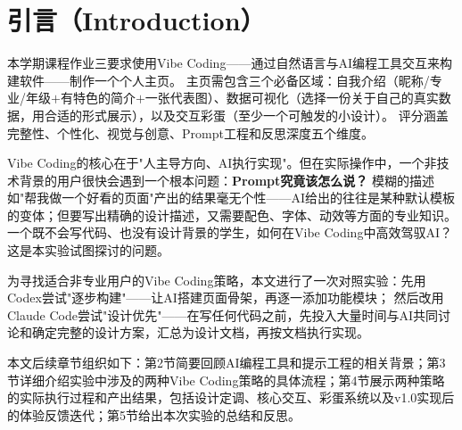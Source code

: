 \section{引言（Introduction）}

本学期课程作业三要求使用Vibe Coding——通过自然语言与AI编程工具交互来构建软件——制作一个个人主页。
主页需包含三个必备区域：自我介绍（昵称/专业/年级$+$有特色的简介$+$一张代表图）、数据可视化（选择一份关于自己的真实数据，用合适的形式展示），以及交互彩蛋（至少一个可触发的小设计）。
评分涵盖完整性、个性化、视觉与创意、Prompt工程和反思深度五个维度。

Vibe Coding的核心在于"人主导方向、AI执行实现"。但在实际操作中，一个非技术背景的用户很快会遇到一个根本问题：\textbf{Prompt究竟该怎么说？}
模糊的描述如"帮我做一个好看的页面"产出的结果毫无个性——AI给出的往往是某种默认模板的变体；但要写出精确的设计描述，又需要配色、字体、动效等方面的专业知识。
一个既不会写代码、也没有设计背景的学生，如何在Vibe Coding中高效驾驭AI？这是本实验试图探讨的问题。

为寻找适合非专业用户的Vibe Coding策略，本文进行了一次对照实验：先用Codex尝试"逐步构建"——让AI搭建页面骨架，再逐一添加功能模块；
然后改用Claude Code尝试"设计优先"——在写任何代码之前，先投入大量时间与AI共同讨论和确定完整的设计方案，汇总为设计文档，再按文档执行实现。

本文后续章节组织如下：第2节简要回顾AI编程工具和提示工程的相关背景；第3节详细介绍实验中涉及的两种Vibe Coding策略的具体流程；第4节展示两种策略的实际执行过程和产出结果，包括设计定调、核心交互、彩蛋系统以及v1.0实现后的体验反馈迭代；第5节给出本次实验的总结和反思。
